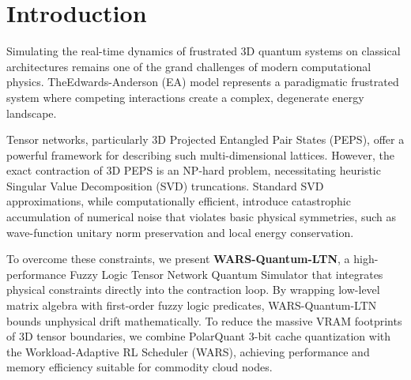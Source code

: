 \documentclass[sigconf,nonacm=false]{acmart}
\begin{document}


\maketitle

\section{Introduction}
\label{sec:intro}

Simulating the real-time dynamics of frustrated 3D quantum systems on classical architectures remains one of the grand challenges of modern computational physics. TheEdwards-Anderson (EA) model represents a paradigmatic frustrated system where competing interactions create a complex, degenerate energy landscape. 

Tensor networks, particularly 3D Projected Entangled Pair States (PEPS), offer a powerful framework for describing such multi-dimensional lattices. However, the exact contraction of 3D PEPS is an NP-hard problem, necessitating heuristic Singular Value Decomposition (SVD) truncations. Standard SVD approximations, while computationally efficient, introduce catastrophic accumulation of numerical noise that violates basic physical symmetries, such as wave-function unitary norm preservation and local energy conservation.

To overcome these constraints, we present \textbf{WARS-Quantum-LTN}, a high-performance Fuzzy Logic Tensor Network Quantum Simulator that integrates physical constraints directly into the contraction loop. By wrapping low-level matrix algebra with first-order fuzzy logic predicates, WARS-Quantum-LTN bounds unphysical drift mathematically. To reduce the massive VRAM footprints of 3D tensor boundaries, we combine PolarQuant 3-bit cache quantization with the Workload-Adaptive RL Scheduler (WARS), achieving performance and memory efficiency suitable for commodity cloud nodes.

\end{document}
